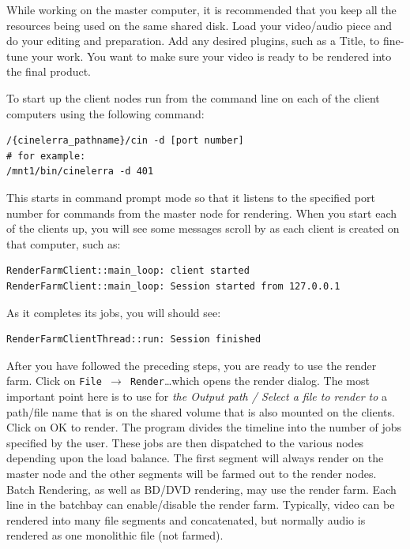 \begin{description}
\begin{enumerate}
  \end{enumerate}
\item[Create Workflow] While working on the master computer, it is
  recommended that you keep all the resources being used on the same
  shared disk.  Load your video/audio piece and do your editing and
  preparation.  Add any desired plugins, such as a Title, to fine-tune
  your work.  You want to make sure your video is ready to be rendered
  into the final product.
\item[Start the Client Nodes] To start up the client nodes run
  \CGG{} from the command line on each of the client computers using
  the following command:
\begin{lstlisting}[style=sh]
/{cinelerra_pathname}/cin -d [port number]
# for example:
/mnt1/bin/cinelerra -d 401
\end{lstlisting} This starts \CGG{} in command prompt mode so that
  it listens to the specified port number for commands from the master
  node for rendering.  When you start each of the clients up, you will
  see some messages scroll by as each client is created on that
  computer, such as:
\begin{lstlisting}[style=sh]
RenderFarmClient::main_loop: client started
RenderFarmClient::main_loop: Session started from 127.0.0.1
\end{lstlisting} As it completes its jobs, you will should see:
\begin{lstlisting}[style=sh]
RenderFarmClientThread::run: Session finished
\end{lstlisting}
\item[Render Using Render Farm] After you have followed the
  preceding steps, you are ready to use the render farm.  Click on
  \texttt{File $\rightarrow$ Render}\dots which opens the render
  dialog.  The most important point here is to use for \textit{the
    Output path / Select a file to render to} a path/file name that is
  on the shared volume that is also mounted on the clients.  Click on
  OK to render. The \CGG{} program divides the timeline into the
  number of jobs specified by the user.  These jobs are then
  dispatched to the various nodes depending upon the load balance. The
  first segment will always render on the master node and the other
  segments will be farmed out to the render nodes.  Batch Rendering,
  as well as BD/DVD rendering, may use the render farm.  Each line in
  the batchbay can enable/disable the render farm.  Typically, video
  can be rendered into many file segments and concatenated, but
  normally audio is rendered as one monolithic file (not farmed).


\end{description}
